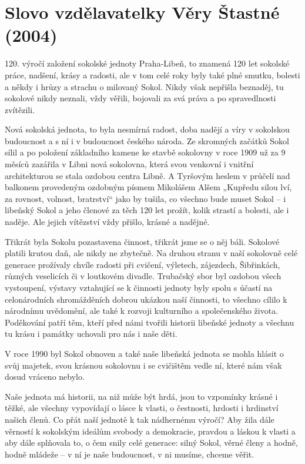 \section{Slovo vzdělavatelky Věry Štastné
(2004)}\label{slovo-vzdux11blavatelky-vux11bry-ux161tastnuxe9-2004}

120. výročí založení sokolské jednoty Praha-Libeň, to znamená 120 let
sokolské práce, nadšení, krásy a radosti, ale v tom celé roky byly také
plné smutku, bolesti a někdy i hrůzy a strachu o milovaný Sokol. Nikdy
však nepřišla beznaděj, tu sokolové nikdy neznali, vždy věřili, bojovali
za svá práva a po spravedlnosti zvítězili.

Nová sokolská jednota, to byla nesmírná radost, doba nadějí a víry v
sokolskou budoucnost a s ní i v budoucnost českého národa. Ze skromných
začátků Sokol sílil a po položení základního kamene ke stavbě sokolovny
v roce 1909 už za 9 měsíců zazářila v Libni nová sokolovna, která svou
venkovní i vnitřní architekturou se stala ozdobou centra Libně. A
Tyršovým heslem v průčelí nad balkonem provedeným ozdobným písmem
Mikolášem Alšem „Kupředu silou lví, za rovnost, volnost, bratrství``
jako by tušila, co všechno bude muset Sokol --⁠⁠⁠⁠⁠⁠ i libeňský Sokol a jeho
členové za těch 120 let prožít, kolik strastí a bolesti, ale i naděje.
Ale jejich vítězství vždy přišlo, krásné a nadějné.

Třikrát byla Sokolu pozastavena činnost, třikrát jsme se o něj báli.
Sokolové platili krutou daň, ale nikdy ne zbytečně. Na druhou stranu v
naší sokolovně celé generace prožívaly chvíle radosti při cvičení,
výletech, zájezdech, Šibřinkách, různých veselicích či v loutkovém
divadle. Trubačský sbor byl ozdobou všech vystoupení, výstavy vztahující
se k činnosti jednoty byly spolu s účastí na celonárodních shromážděních
dobrou ukázkou naší činnosti, to všechno cílilo k národnímu uvědomění,
ale také k rozvoji kulturního a společenského života. Poděkování patří
těm, kteří před námi tvořili historii libeňské jednoty a všechnu tu
krásu i památky uchovali pro nás i naše děti.

V roce 1990 byl Sokol obnoven a také naše libeňská jednota se mohla
hlásit o svůj majetek, svou krásnou sokolovnu i se cvičištěm vedle ní,
které nám však dosud vráceno nebylo.

Naše jednota má historii, na niž může být hrdá, jsou to vzpomínky krásné
i těžké, ale všechny vypovídají o lásce k vlasti, o čestnosti, hrdosti i
hrdinství našich členů. Co přát naší jednotě k tak nádhernému výročí?
Aby žila dále věrností k sokolským ideálům svobody a demokracie, pravdou
a láskou k vlasti a aby dále splňovala to, o čem snily celé generace:
silný Sokol, věrné členy a hodně, hodně mládeže --⁠⁠⁠⁠⁠⁠ v ní je naše
budoucnost, v ni musíme, chceme věřit.

